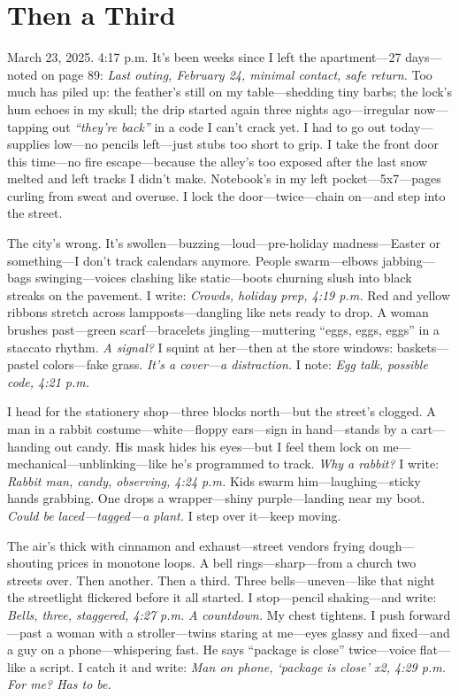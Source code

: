 \documentclass{article}
\begin{document}
\section*{Then a Third}

March 23, 2025. 4:17 p.m. It’s been weeks since I left the apartment—27 days—noted on page 89: \textit{Last outing, February 24, minimal contact, safe return.} Too much has piled up: the feather’s still on my table—shedding tiny barbs; the lock’s hum echoes in my skull; the drip started again three nights ago—irregular now—tapping out \textit{“they’re back”} in a code I can’t crack yet. I had to go out today—supplies low—no pencils left—just stubs too short to grip. I take the front door this time—no fire escape—because the alley’s too exposed after the last snow melted and left tracks I didn’t make. Notebook’s in my left pocket—5x7—pages curling from sweat and overuse. I lock the door—twice—chain on—and step into the street.

The city’s wrong. It’s swollen—buzzing—loud—pre-holiday madness—Easter or something—I don’t track calendars anymore. People swarm—elbows jabbing—bags swinging—voices clashing like static—boots churning slush into black streaks on the pavement. I write: \textit{Crowds, holiday prep, 4:19 p.m.} Red and yellow ribbons stretch across lampposts—dangling like nets ready to drop. A woman brushes past—green scarf—bracelets jingling—muttering “eggs, eggs, eggs” in a staccato rhythm. \textit{A signal?} I squint at her—then at the store windows: baskets—pastel colors—fake grass. \textit{It’s a cover—a distraction.} I note: \textit{Egg talk, possible code, 4:21 p.m.}

I head for the stationery shop—three blocks north—but the street’s clogged. A man in a rabbit costume—white—floppy ears—sign in hand—stands by a cart—handing out candy. His mask hides his eyes—but I feel them lock on me—mechanical—unblinking—like he’s programmed to track. \textit{Why a rabbit?} I write: \textit{Rabbit man, candy, observing, 4:24 p.m.} Kids swarm him—laughing—sticky hands grabbing. One drops a wrapper—shiny purple—landing near my boot. \textit{Could be laced—tagged—a plant.} I step over it—keep moving.

The air’s thick with cinnamon and exhaust—street vendors frying dough—shouting prices in monotone loops. A bell rings—sharp—from a church two streets over. Then another. Then a third. Three bells—uneven—like that night the streetlight flickered before it all started. I stop—pencil shaking—and write: \textit{Bells, three, staggered, 4:27 p.m.} \textit{A countdown.} My chest tightens. I push forward—past a woman with a stroller—twins staring at me—eyes glassy and fixed—and a guy on a phone—whispering fast. He says “package is close” twice—voice flat—like a script. I catch it and write: \textit{Man on phone, ‘package is close’ x2, 4:29 p.m.} \textit{For me? Has to be.}
\end{document}
